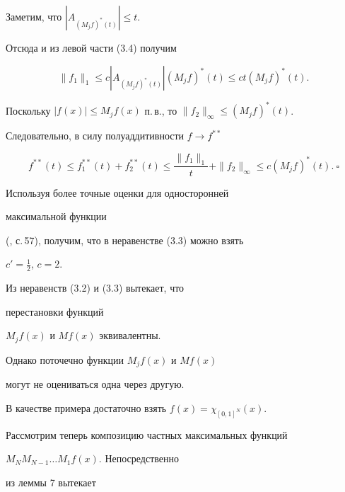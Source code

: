 Заметим, что $|A_{(M_j f)^*(t)}|\le t$. 


Отсюда и из левой части (3.4) получим 


$$ 


\|f_1\|_1 \le c|A_{(M_j f)^*(t)}|(M_j f)^*(t) 


\le ct(M_j f)^*(t). 


$$ 


Поскольку $|f(x)|\le M_j f(x)$ п.\,в., то $\|f_2\|_\infty\le(M_j f)^*(t)$. 


Следовательно, в силу полуаддитивности $f\to f^{**}$ 


$$ 


f^{**}(t)\le f_1^{**}(t)+f_2^{**}(t) \le 


\frac{\|f_1\|_1}{t}+\|f_2\|_\infty \le c(M_j f)^*(t). \ \square 


$$ 


 


\begin{note} Используя более точные оценки для односторонней 


максимальной функции 


(\cite{Guz2}, с.\,57), получим, что в неравенстве (3.3) можно взять 


$c'=\frac{1}{2}$, $c=2$. 


\end{note} 


 


\begin{note} Из неравенств (3.2) и (3.3) вытекает, что 


перестановки функций 


$M_jf(x)$ и $Mf(x)$ эквивалентны. 


\end{note} 


 


Однако поточечно функции $M_jf(x)$ и $Mf(x)$ 


могут не оцениваться одна через другую. 


В качестве примера достаточно взять $f(x)=\chi_{[0,1]^N}(x)$. 


 


Рассмотрим теперь композицию частных максимальных функций 


$M_N M_{N-1}\dots M_1f(x)$. Непосредственно 


из леммы 7 вытекает 


